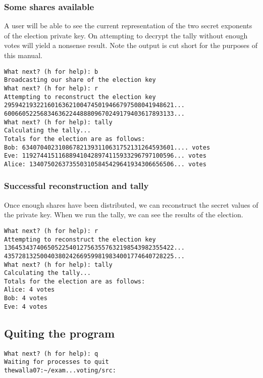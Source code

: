\documentclass[a4paper,12pt]{article}
\begin{document}
\subsubsection{Some shares available}
A user will be able to see the current representation of the two secret exponents of the election private key. On attempting to decrypt the tally without enough votes will yield a nonsense result. Note the output is cut short for the purposes of this manual.
\begin{verbatim}
What next? (h for help): b
Broadcasting our share of the election key
What next? (h for help): r
Attempting to reconstruct the election key
29594219322160163621004745019466797508041948621...
60066052256834636224488809670249179403617893133...
What next? (h for help): tally
Calculating the tally...
Totals for the election are as follows:
Bob: 634070402310867821393110631752131264593601.... votes
Eve: 119274415116889410428974115933296797100596... votes
Alice: 1340750263735503105845429641934306656506... votes
\end{verbatim}

\subsubsection{Successful reconstruction and tally}
Once enough shares have been distributed, we can reconstruct the secret values of the private key. When we run the tally, we can see the results of the election.
\begin{verbatim}
What next? (h for help): r
Attempting to reconstruct the election key
13645343740650522540127563557632198543982355422...
43572813250040380242669599819834001774640728225...
What next? (h for help): tally
Calculating the tally...
Totals for the election are as follows:
Alice: 4 votes
Bob: 4 votes
Eve: 4 votes
\end{verbatim}

\subsection{Quiting the program}
\begin{verbatim}
What next? (h for help): q
Waiting for processes to quit
thewalla07:~/exam...voting/src:
\end{verbatim}

\newpage
\end{document}
